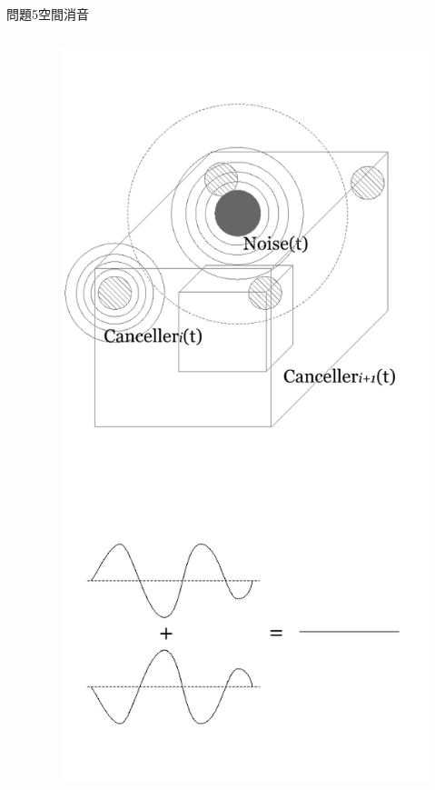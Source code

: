 \documentclass[dvipdfmx]{beamer}
\begin{document}
\begin{frame}{問題5}{空間消音}
\begin{columns}[t]
\begin{column}{0.7\textwidth}
\end{column}
\begin{column}{0.3\textwidth}
\begin{figure}[htbp]
    \centering
    \includegraphics[bb=0mm 0mm 100.0mm 170.0mm, scale=0.35, type=pdf]{img/problem5.pdf}
\end{figure}
\end{column}
\end{columns}
\end{frame}
\end{document}
